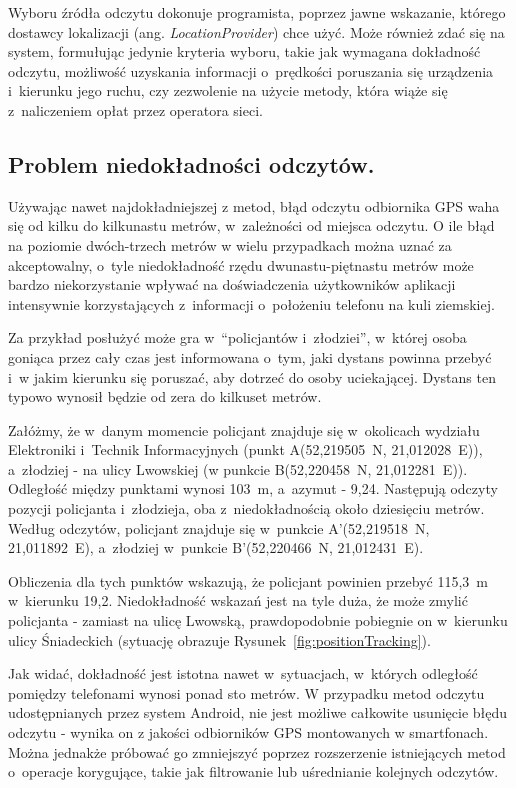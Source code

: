 \documentclass[a4paper,twocolumn,11pt]{article}
\begin{document}
Wyboru źródła odczytu dokonuje programista, poprzez jawne wskazanie, którego dostawcy lokalizacji (ang. \emph{LocationProvider}) chce użyć.
Może również zdać się na system, formułując jedynie kryteria wyboru, takie jak wymagana dokładność odczytu, możliwość uzyskania informacji o~prędkości poruszania się urządzenia i~kierunku jego ruchu, czy zezwolenie na użycie metody, która wiąże się z~naliczeniem opłat przez operatora sieci.


\subsection{Problem niedokładności odczytów.}
 Używając nawet najdokładniejszej z metod, błąd odczytu odbiornika GPS waha się od kilku do kilkunastu metrów, w~zależności od miejsca odczytu.
 O ile błąd na poziomie dwóch-trzech metrów w wielu przypadkach można uznać za akceptowalny, o~tyle niedokładność rzędu dwunastu-piętnastu metrów może bardzo niekorzystanie wpływać na doświadczenia użytkowników aplikacji intensywnie korzystających z~informacji o~położeniu telefonu na kuli ziemskiej.
 
 Za przykład posłużyć może gra w~``policjantów i~złodziei'', w~której osoba goniąca przez cały czas jest informowana o~tym, jaki dystans powinna przebyć i~w jakim kierunku się poruszać, aby dotrzeć do osoby uciekającej.
 Dystans ten typowo wynosił będzie od zera do kilkuset metrów.
 
 Załóżmy, że w~danym momencie policjant znajduje się w~okolicach wydziału Elektroniki i~Technik Informacyjnych (punkt A(52,219505\textdegree~N, 21,012028\textdegree~E)), a~złodziej - na ulicy Lwowskiej (w punkcie B(52,220458\textdegree~N, 21,012281\textdegree~E)).
 Odległość między punktami wynosi 103~m, a~azymut - 9,24\textdegree.
 Następują odczyty pozycji policjanta i~złodzieja, oba z~niedokładnością około dziesięciu metrów.
 Według odczytów, policjant znajduje się w~punkcie A'(52,219518\textdegree~N, 21,011892\textdegree~E), a~złodziej w~punkcie B'(52,220466\textdegree~N, 21,012431\textdegree~E).
 
 Obliczenia dla tych punktów wskazują, że policjant powinien przebyć 115,3~m w~kierunku 19,2\textdegree.
 Niedokładność wskazań jest na tyle duża, że może zmylić policjanta - zamiast na ulicę Lwowską, prawdopodobnie pobiegnie on w~kierunku ulicy Śniadeckich (sytuację obrazuje Rysunek~\ref{fig:positionTracking}).


 
 Jak widać, dokładność jest istotna nawet w~sytuacjach, w~których odległość pomiędzy telefonami wynosi ponad sto metrów.
 W przypadku metod odczytu udostępnianych przez system Android, nie jest możliwe całkowite usunięcie błędu odczytu - wynika on z jakości odbiorników GPS montowanych w smartfonach. Można jednakże próbować go zmniejszyć poprzez rozszerzenie istniejących metod o~operacje korygujące, takie jak filtrowanie lub uśrednianie kolejnych odczytów.
\end{document}
